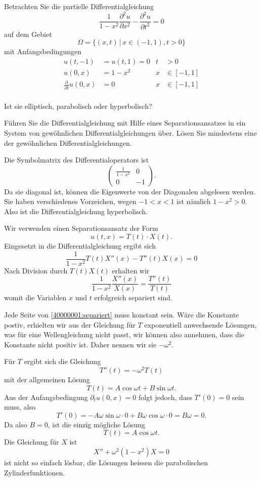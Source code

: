 Betrachten Sie die partielle Differentialgleichung
\[
\frac1{1-x^2}\frac{\partial^2 u}{\partial x^2}
-
\frac{\partial^2 u}{\partial t^2}=0
\]
auf dem Gebiet
\[
\Omega=\{(x,t)\,|\, x\in (-1,1), t>0\}
\]
mit Anfangsbedingungen
\begin{align*}
u(t,-1)&=u(t,1)=0&t&>0\\
u(0,x)&=1-x^2&x&\in[-1,1]\\
\frac{\partial}{\partial t}u(0,x)&=0&x&\in[-1,1]\\
\end{align*}
\begin{teilaufgaben}
\item Ist sie elliptisch, parabolisch oder hyperbolisch?
\item Führen Sie die Differentialgleichung mit Hilfe eines
Separationsansatzes in ein System von gewöhnlichen
Differentialgleichungen über. Lösen Sie mindestens eine der
gewöhnlichen Differentialgleichungen.
\end{teilaufgaben}

\begin{loesung}
\begin{teilaufgaben}
\item
Die Symbolmatrix des Differentialoperators ist
\[
\begin{pmatrix}
\frac1{1-x^2}&0\\0&-1
\end{pmatrix}.
\]
Da sie diagonal ist, können die Eigenwerte von der Diagonalen
abgelesen werden. Sie haben verschiedenes Vorzeichen, wegen
$-1<x<1$ ist nämlich $1-x^2>0$. Also ist die Differentialgleichung
hyperbolisch.
\item
Wir verwenden einen Separationsansatz der Form
\[
u(t,x)=T(t)\cdot X(t).
\]
Eingesetzt in die Differentialgleichung ergibt sich
\[
\frac1{1-x^2}T(t)X''(x)-T''(t)X(x)=0
\]
Nach Division durch $T(t)X(t)$ erhalten wir
\begin{equation}
\frac1{1-x^2}\frac{X''(x)}{X(x)}=\frac{T''(t)}{T(t)}
\label{40000001:separiert}
\end{equation}
womit die Variablen $x$ und $t$ erfolgreich separiert sind.

Jede Seite von \eqref{40000001:separiert} muss konstant sein. Wäre die
Konstante postiv, erhielten wir aus der Gleichung für $T$ exponentiell
anwechsende Lösungen, was für eine Wellengleichung nicht passt, wir
können also annehmen, dass die Konstante nicht positiv ist.
Daher nennen wir sie $-\omega^2$.

Für $T$ ergibt sich die Gleichung
\[
T''(t)=-\omega^2 T(t)
\]
mit der allgemeinen Lösung
\[
T(t)=A\cos\omega t+B\sin\omega t.
\]
Aus der Anfangsbedingung $\partial_t u(0,x)=0$ folgt jedoch, dass
$T'(0)=0$ sein muss, also
\[
T'(0)=-A\omega\sin\omega \cdot 0+B\omega\cos\omega\cdot 0=B\omega=0.
\]
Da also $B=0$, ist die einzig mögliche Lösung
\[
T(t)=A\cos\omega t.
\]
Die Gleichung für $X$ ist
\[
X''+\omega^2(1-x^2)X=0
\]
ist nicht so einfach lösbar, die Lösungen heissen die parabolischen
Zylinderfunktionen.
\qedhere
\end{teilaufgaben}
\end{loesung}

